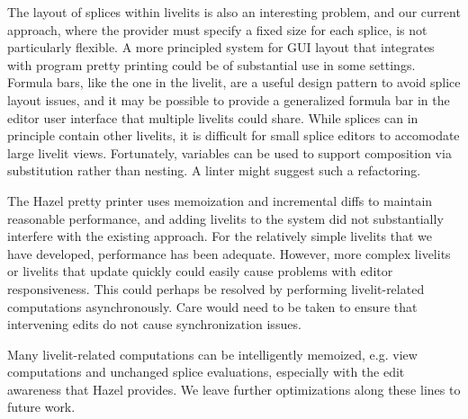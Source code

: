 The layout of splices within livelits is also an interesting problem, and our current approach, where 
the provider must specify a fixed size for each splice, is not particularly flexible. 
A more principled system for GUI layout that integrates with program pretty 
printing could be of substantial use in some settings. Formula bars, like the one in the 
livelit, are a useful design pattern to avoid splice layout issues, and it may be possible to provide 
a generalized formula bar in the editor user interface that multiple livelits could share.
While splices can in principle contain other livelits, it is difficult for small splice editors to 
accomodate large livelit views. Fortunately, variables can be used to support composition via substitution 
rather than nesting. A linter might suggest such a refactoring.

The Hazel pretty printer uses memoization and incremental diffs to maintain reasonable performance,
and adding livelits to the system did not substantially interfere with the existing approach.
For the relatively simple livelits that we have developed, performance has been adequate.
However, more complex  livelits or livelits that update quickly 
could easily cause problems with editor responsiveness.
This could perhaps be resolved by performing livelit-related computations asynchronously. Care 
would need to be taken to ensure that intervening edits do not cause synchronization issues.

Many livelit-related computations can be intelligently memoized, e.g. view computations and unchanged splice evaluations,
especially with the edit awareness that Hazel provides. We leave further optimizations along these lines to future work.
